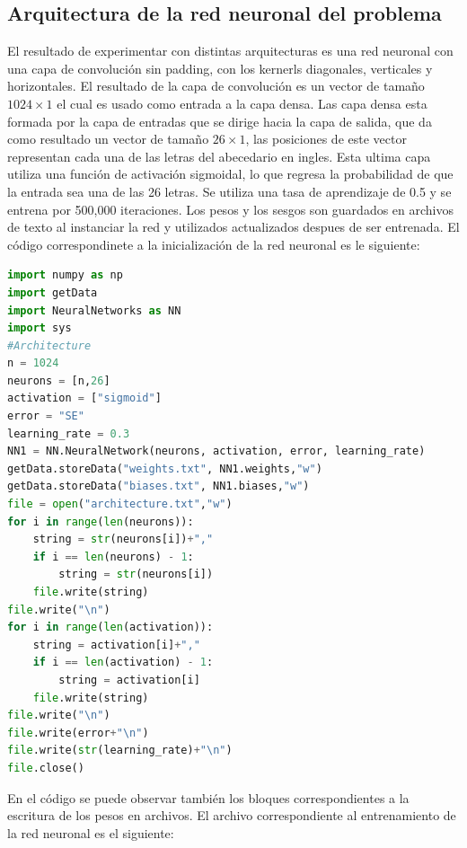 \documentclass{article}
\begin{document}
\subsection{Arquitectura de la red neuronal del problema}
El resultado de experimentar con distintas arquitecturas es una red neuronal con una capa de convolución sin padding, con los kernerls diagonales, verticales y horizontales. 
El resultado de la capa de convolución es un vector de tamaño $1024\times1$ el cual es usado como entrada a la capa densa. Las capa densa esta formada por la capa de entradas que se dirige hacia la capa de salida, que da como resultado un
vector de tamaño $26\times1$, las posiciones de este vector representan cada una de las letras del abecedario en ingles. Esta ultima capa utiliza una función de activación sigmoidal, lo que regresa la probabilidad de que la entrada sea una de las 26 letras.
Se utiliza una tasa de aprendizaje de 0.5 y se entrena por 500,000 iteraciones. Los pesos y los sesgos son guardados en archivos de texto al instanciar la red y utilizados actualizados despues de ser entrenada. El código correspondinete a la inicialización de la red neuronal es le siguiente:
\begin{lstlisting}[language=python]
import numpy as np
import getData
import NeuralNetworks as NN
import sys
#Architecture
n = 1024
neurons = [n,26]
activation = ["sigmoid"]
error = "SE"
learning_rate = 0.3
NN1 = NN.NeuralNetwork(neurons, activation, error, learning_rate)
getData.storeData("weights.txt", NN1.weights,"w")
getData.storeData("biases.txt", NN1.biases,"w")
file = open("architecture.txt","w")
for i in range(len(neurons)):
    string = str(neurons[i])+","
    if i == len(neurons) - 1:
        string = str(neurons[i])
    file.write(string)
file.write("\n")
for i in range(len(activation)):
    string = activation[i]+","
    if i == len(activation) - 1:
        string = activation[i]
    file.write(string)
file.write("\n")
file.write(error+"\n")
file.write(str(learning_rate)+"\n")
file.close()
\end{lstlisting}
En el código se puede observar también los bloques correspondientes a la escritura de los pesos en archivos.
El archivo correspondiente al entrenamiento de la red neuronal es el siguiente:
\end{document}
